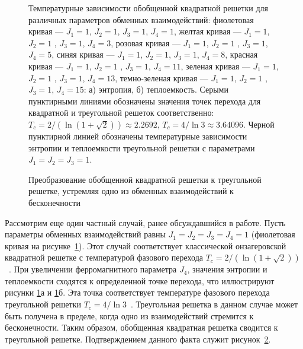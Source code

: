 \begin{figure}[h]
	\begin{minipage}[h]{0.5\linewidth}
	\end{minipage}
	\hfill
	\begin{minipage}[h]{0.5\linewidth}
	\end{minipage}
	\caption{Температурные зависимости обобщенной квадратной решетки для различных параметров обменных взаимодействий: фиолетовая кривая --- $J_1 = 1$, $J_2 = 1$, $J_3 = 1$, $J_4 = 1$, желтая кривая --- $J_1 = 1$, $J_2 = 1$ , $J_3 = 1$, $J_4 = 3$, розовая кривая --- $J_1 = 1$, $J_2 = 1$ , $J_3 = 1$, $J_4 = 5$, синяя кривая --- $J_1 = 1$, $J_2 = 1$, $J_3 = 1$, $J_4 = 8$, красная кривая --- $J_1 = 1$, $J_2 = 1$ , $J_3 = 1$, $J_4 = 11$, зеленая кривая --- $J_1 = 1$, $J_2 = 1$ , $J_3 = 1$, $J_4 = 13$, темно-зеленая кривая --- $J_1 = 1$, $J_2 = 1$ , $J_3 = 1$, $J_4 = 15$: а) энтропия, б) теплоемкость. Серыми пунктирными линиями обозначены значения точек перехода для квадратной и треугольной решеток соответственно: $T_c = 2/(\ln(1+\sqrt{2}))\approx 2.2692$,  $T_c = 4/\ln 3\approx 3.64096$. Черной пунктирной линией обозначены температурные зависимости энтропии и теплоемкости треугольной решетки с параметрами $J_1 = J_2 = J_3 = 1$.}
	\label{Triangular}
\end{figure}

\begin{figure}[h]
	\caption{Преобразование обобщенной квадратной решетки к треугольной решетке, устремляя одно из обменных взаимодействий к бесконечности}
	\label{triag}
\end{figure}

Рассмотрим еще один частный случай, ранее обсуждавшийся в работе. Пусть параметры обменных взаимодействий равны $J_1 = J_2 = J_3 = J_4 = 1$ (фиолетовая кривая на рисунке~\ref{Triangular}). Этот случай соответствует классической онзагеровской квадратной решетке с температурой фазового перехода $T_c = 2/(\ln (1+\sqrt{2}))$~\cite{kramers_wannier1, kramers_wannier2}. При увеличении ферромагнитного параметра $J_4$, значения энтропии и теплоемкости сходятся к определенной точке перехода, что иллюстрируют рисунки \ref{Triangular}а и \ref{Triangular}б. Эта точка соответствует температуре фазового перехода треугольной решетки $T_c = 4/\ln 3$~\cite{wannier1950}. Треугольная решетка в данном случае может быть получена в пределе, когда одно из взаимодействий стремится к бесконечности. Таким образом, обобщенная квадратная решетка сводится к треугольной решетке. Подтверждением данного факта служит рисунок~\ref{triag}. 


